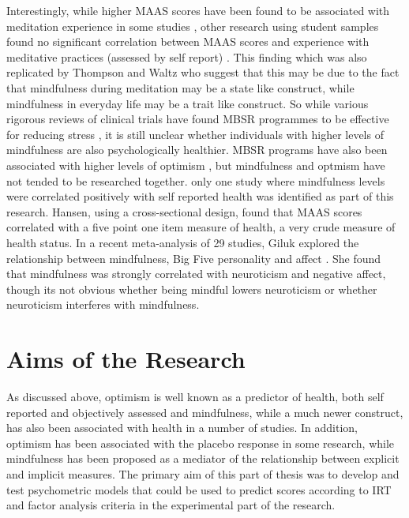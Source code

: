 \documentclass{article}
\begin{document}
 Interestingly, while higher MAAS scores have been found to be associated with meditation experience in some 
studies \cite{brown2003benefits}, other research using student samples found no significant correlation between 
MAAS scores and experience with meditative practices (assessed by self report) \cite{MacKillop2007} . This finding which
 was also replicated by Thompson and Waltz \cite{thompson2007everyday}  who suggest that this may be due to the fact that 
mindfulness during meditation may be a state like construct, while mindfulness in everyday life may be a trait like construct. 
So while various rigorous reviews of clinical trials have found MBSR programmes to be effective for
 reducing stress \cite{Chiesa2009,praissman2008mindfulness} , it is still unclear whether individuals 
with higher levels of mindfulness are also psychologically healthier.
 MBSR programs have also been associated with higher levels of optimism
 \cite{Carson2004}, but mindfulness and optmism have not tended to be researched together. 
 only one study where mindfulness levels were correlated positively 
with self reported health \cite{Hansen2009} was identified as part of this research. Hansen, using a cross-sectional design, 
found that MAAS scores correlated with a five point one item measure of health,   
a very crude measure of health status. In a recent meta-analysis of 29 studies, 
Giluk explored the relationship between mindfulness, Big Five personality and affect \cite{giluk2009mindfulness}.
She found that mindfulness was strongly correlated with neuroticism and negative affect,
 though its not obvious whether being mindful lowers neuroticism or 
 whether neuroticism interferes with mindfulness. 


\section{Aims of the Research}

As discussed above, optimism is well known as a predictor of health, both self reported and objectively assessed and mindfulness, while a much newer construct, has also been associated with health in a number of studies.  In addition, optimism has been associated with the placebo response in some research, while mindfulness has been proposed as a mediator of the relationship between explicit and implicit measures.
The primary aim of this part of thesis was to develop and test psychometric models that could be used to predict scores according to IRT and factor analysis criteria in the experimental part of the research.
\end{document}
